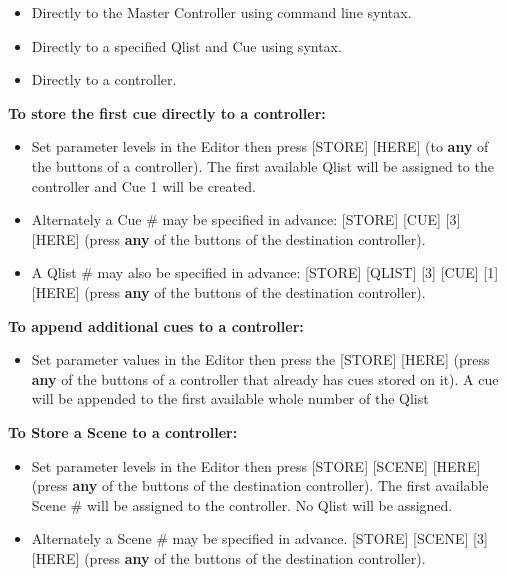 \documentclass[
]{article}
\providecommand{\tightlist}{%
  \setlength{\itemsep}{0pt}\setlength{\parskip}{0pt}}
\begin{document}
\begin{itemize}
\item
  Directly to the Master Controller using command line syntax.
\item
  Directly to a specified Qlist and Cue using syntax.
\item
  Directly to a controller.
\end{itemize}

\textbf{To store the first cue directly to a controller:}

\begin{itemize}
\item
  Set parameter levels in the Editor then press {[}STORE{]} {[}HERE{]} (to \textbf{any} of the buttons of a controller). The first available Qlist will be assigned to the controller and Cue 1 will be created.
\item
  Alternately a Cue \# may be specified in advance: {[}STORE{]} {[}CUE{]} {[}3{]} {[}HERE{]} (press \textbf{any} of the buttons of the destination controller).
\item
  A Qlist \# may also be specified in advance: {[}STORE{]} {[}QLIST{]} {[}3{]} {[}CUE{]} {[}1{]} {[}HERE{]} (press \textbf{any} of the buttons of the destination controller).
\end{itemize}

\textbf{To append additional cues to a controller:}

\begin{itemize}
\tightlist
\item
  Set parameter values in the Editor then press the {[}STORE{]} {[}HERE{]} (press \textbf{any} of the buttons of a controller that already has cues stored on it). A cue will be appended to the first available whole number of the Qlist
\end{itemize}

\textbf{To Store a Scene to a controller:}

\begin{itemize}
\item
  Set parameter levels in the Editor then press {[}STORE{]} {[}SCENE{]} {[}HERE{]} (press \textbf{any} of the buttons of the destination controller). The first available Scene \# will be assigned to the controller. No Qlist will be assigned.
\item
  Alternately a Scene \# may be specified in advance. {[}STORE{]} {[}SCENE{]} {[}3{]} {[}HERE{]} (press \textbf{any} of the buttons of the destination controller).
\end{itemize}
\end{document}
